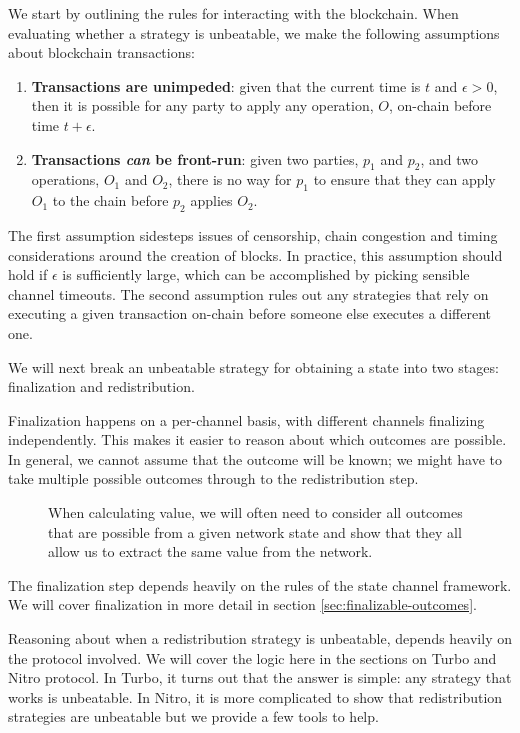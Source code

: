We start by outlining the rules for interacting with the blockchain.
When evaluating whether a strategy is unbeatable, we make the following assumptions about blockchain transactions:
\begin{enumerate}
  \item \textbf{Transactions are unimpeded}: given that the current time is $t$ and $\epsilon > 0$, then it is possible for any party to apply any operation, $O$, on-chain before time $t + \epsilon$.
  \item \textbf{Transactions \textit{can} be front-run}: given two parties, $p_1$ and $p_2$, and two operations, $O_1$ and $O_2$, there is no way for $p_1$ to ensure that they can apply $O_1$ to the chain before $p_2$ applies $O_2$.
\end{enumerate}
The first assumption sidesteps issues of censorship, chain congestion and timing considerations around the creation of blocks.
In practice, this assumption should hold if $\epsilon$ is sufficiently large, which can be accomplished by picking sensible channel timeouts.
The second assumption rules out any strategies that rely on executing a given transaction on-chain before someone else executes a different one.

We will next break an unbeatable strategy for obtaining a state into two stages: finalization and redistribution. 

Finalization happens on a per-channel basis, with different channels finalizing independently.
This makes it easier to reason about which outcomes are possible.
In general, we cannot assume that the outcome will be known;
we might have to take multiple possible outcomes through to the redistribution step.
\begin{figure}[h]\centering
  \makebox[\textwidth][c]{}
  \caption{When calculating value, we will often need to consider all outcomes that are possible from a given network state and show that they all allow us to extract the same value from the network.}
\end{figure}
The finalization step depends heavily on the rules of the state channel framework.
We will cover finalization in more detail in section \ref{sec:finalizable-outcomes}.

Reasoning about when a redistribution strategy is unbeatable, depends heavily on the protocol involved. 
We will cover the logic here in the sections on Turbo and Nitro protocol.
In Turbo, it turns out that the answer is simple: any strategy that works is unbeatable.
In Nitro, it is more complicated to show that redistribution strategies are unbeatable but we provide a few tools to help.

